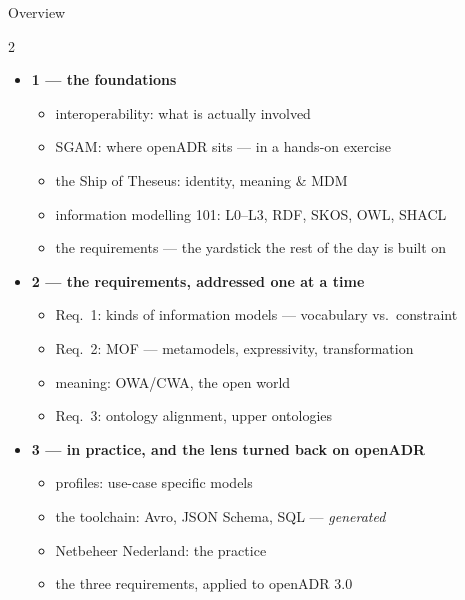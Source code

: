 \begin{frame}{Overview}
  \small
  \begin{multicols}{2}
    \begin{itemize}
      \item \textbf{1 — the foundations}
      \begin{itemize}
        \item interoperability: what is actually involved
        \item SGAM: where openADR sits — \alert{in a hands-on exercise}
        \item the Ship of Theseus: identity, meaning \& MDM
        \item information modelling 101: L0--L3, RDF, SKOS, OWL, SHACL
        \item the requirements — the yardstick the rest of the day is built on
      \end{itemize}
      \item \textbf{2 — the requirements, addressed one at a time}
      \begin{itemize}
        \item Req.\ 1: kinds of information models — vocabulary vs.\ constraint
        \item Req.\ 2: MOF — metamodels, expressivity, transformation
        \item meaning: OWA/CWA, the open world
        \item Req.\ 3: ontology alignment, upper ontologies
      \end{itemize}
      \item \textbf{3 — in practice, and the lens turned back on openADR}
      \begin{itemize}
        \item profiles: use-case specific models
        \item the toolchain: Avro, JSON Schema, SQL — \emph{generated}
        \item Netbeheer Nederland: the practice
        \item the three requirements, applied to openADR 3.0
      \end{itemize}
    \end{itemize}
  \end{multicols}
\end{frame}
